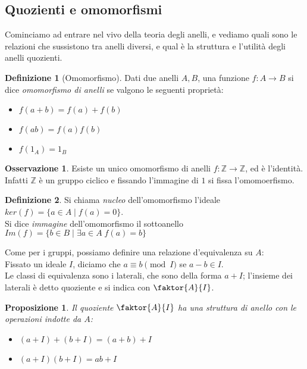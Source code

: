 \documentclass[a4paper,10pt]{article}
\theoremstyle{plain}
\newtheorem{prop}[thm]{Proposizione}
\theoremstyle{definition}
\newtheorem{defn}{Definizione}[section]
\newtheorem*{oss}{Osservazione}
\newcommand{\Z}{\mathbb{Z}}
\begin{document}
\subsection{Quozienti e omomorfismi}
Cominciamo ad entrare nel vivo della teoria degli anelli, e vediamo quali sono le relazioni che sussistono tra anelli diversi, e qual è la struttura e l'utilità degli anelli quozienti.

\begin{defn}[Omomorfismo]
    Dati due anelli $A,B$, una funzione $f:A\to B$ si dice \textit{omomorfismo di anelli} se valgono le seguenti proprietà:
    \begin{itemize}
        \item $f(a+b)=f(a)+f(b)$
        \item $f(ab)=f(a)f(b)$
        \item $f(1_A)=1_B$
    \end{itemize}
\end{defn}
\begin{oss}
    Esiste un unico omomorfismo di anelli $f:\Z\to\Z$, ed è l'identità. Infatti $\Z$ è un gruppo ciclico e fissando l'immagine di $1$ si fissa l'omomoerfismo.
\end{oss}

\begin{defn}
    Si chiama \textit{nucleo} dell'omomorfismo l'ideale $ker(f)=\{a\in A\mid f(a)=0\}$.\\
    Si dice \textit{immagine} dell'omomorfismo il sottoanello $Im(f)=\{b\in B\mid \exists a\in A\; f(a)=b \}$
\end{defn}

Come per i gruppi, possiamo definire una relazione d'equivalenza su $A$:\\
Fissato un ideale $I$, diciamo che $a\equiv b\pmod I$ se $a-b\in I$.\\
Le classi di equivalenza sono i laterali, che sono della forma $a+I$; l'insieme dei laterali è detto quoziente e si indica con $\faktor{A}{I}$.
\begin{prop}
    Il quoziente $\faktor{A}{I}$ ha una struttura di anello con le operazioni indotte da $A$:
    \begin{itemize}
        \item $(a+I)+(b+I)=(a+b)+I$
        \item $(a+I)(b+I)=ab+I$
    \end{itemize}
\end{prop}
\end{document}
